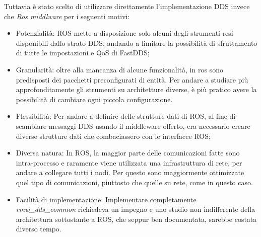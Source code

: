 Tuttavia è stato scelto di utilizzare direttamente l'implementazione DDS invece che \emph{Ros middlware} per i seguenti motivi:
\begin{itemize}
    \item Potenzialità: ROS mette a disposizione solo alcuni degli strumenti resi disponibili dallo strato DDS, andando a limitare la possibilità di sfruttamento di tutte le impostazioni e QoS di FastDDS;
    \item Granularità: oltre alla mancanza di alcune funzionalità, in ros sono predisposti dei pacchetti preconfigurati di entità. Per andare a studiare più approfonditamente gli strumenti su architetture diverse, è più pratico avere la possibilità di cambiare ogni piccola configurazione.
    \item Flessibilità: Per andare a definire delle strutture dati di ROS, al fine di scambiare messaggi DDS usando il middleware offerto, era necessario creare diverse strutture dati che combaciassero con le interfacce ROS;
    \item Diversa natura: In ROS, la maggior parte delle comunicazioni fatte sono intra-processo e raramente viene utilizzata una infrastruttura di rete, per andare a collegare tutti i nodi. Per questo sono maggiormente ottimizzate quel tipo di comunicazioni, piuttosto che quelle su rete, come in questo caso.
    \item Facilità di implementazione: Implementare completamente \emph{rmw\_dds\_common} richiedeva un impegno e uno studio non indifferente della architettura sottostante a ROS, che seppur ben documentata, sarebbe costata diverso tempo. 
\end{itemize}





